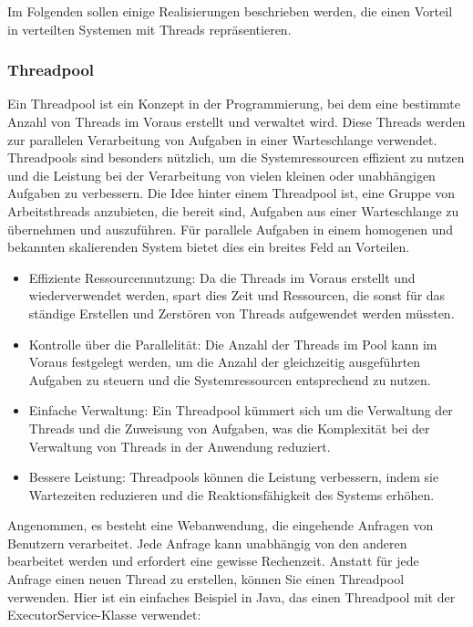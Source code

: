 Im Folgenden sollen einige Realisierungen beschrieben werden, die einen Vorteil in verteilten Systemen mit Threads repräsentieren. 
\subsubsection{Threadpool}
Ein Threadpool ist ein Konzept in der Programmierung, bei dem eine bestimmte Anzahl von Threads im Voraus erstellt und verwaltet wird. Diese Threads werden zur parallelen Verarbeitung von Aufgaben in einer Warteschlange verwendet. Threadpools sind besonders nützlich, um die Systemressourcen effizient zu nutzen und die Leistung bei der Verarbeitung von vielen kleinen oder unabhängigen Aufgaben zu verbessern.
Die Idee hinter einem Threadpool ist, eine Gruppe von Arbeitsthreads anzubieten, die bereit sind, Aufgaben aus einer Warteschlange zu übernehmen und auszuführen. Für parallele Aufgaben in einem homogenen und bekannten skalierenden System bietet dies ein breites Feld an Vorteilen. 
\begin{itemize}
\item Effiziente Ressourcennutzung: Da die Threads im Voraus erstellt und wiederverwendet werden, spart dies Zeit und Ressourcen, die sonst für das ständige Erstellen und Zerstören von Threads aufgewendet werden müssten.
\item Kontrolle über die Parallelität: Die Anzahl der Threads im Pool kann im Voraus festgelegt werden, um die Anzahl der gleichzeitig ausgeführten Aufgaben zu steuern und die Systemressourcen entsprechend zu nutzen.
\item Einfache Verwaltung: Ein Threadpool kümmert sich um die Verwaltung der Threads und die Zuweisung von Aufgaben, was die Komplexität bei der Verwaltung von Threads in der Anwendung reduziert.
\item Bessere Leistung: Threadpools können die Leistung verbessern, indem sie Wartezeiten reduzieren und die Reaktionsfähigkeit des Systems erhöhen.
\end{itemize}
Angenommen, es besteht eine Webanwendung, die eingehende Anfragen von Benutzern verarbeitet. Jede Anfrage kann unabhängig von den anderen bearbeitet werden und erfordert eine gewisse Rechenzeit. Anstatt für jede Anfrage einen neuen Thread zu erstellen, können Sie einen Threadpool verwenden. Hier ist ein einfaches Beispiel in Java, das einen Threadpool mit der ExecutorService-Klasse verwendet:

